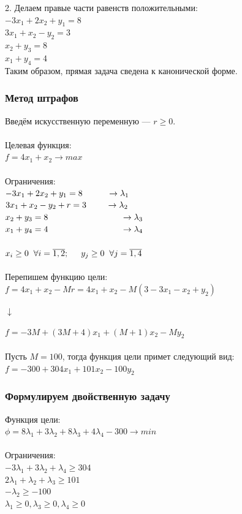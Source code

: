 \documentclass[14pt,a4paper,fleqn]{extarticle}
\begin{document}
2. Делаем правые части равенств положительными:\\
$-3x_1 + 2x_2 + y_1 = 8$\\
$3x_1 + x_2 - y_2 = 3$\\
$x_2 + y_3 = 8$\\
$x_1 + y_4 = 4$\\

Таким образом, прямая задача сведена к канонической форме.
\newpage
\subsubsection*{Метод штрафов}
Введём искусственную переменную --- $r \geq 0$.\\\\
Целевая функция:\\
$f = 4x_1+x_2 \longrightarrow max$\\\\
Ограничения:\\
$-3x_1 + 2x_2 + y_1 = 8 \hspace*{1cm} \rightarrow \lambda_1$\\
$3x_1 + x_2 - y_2 + r = 3 \hspace*{0.8cm} \rightarrow \lambda_2$\\
$x_2 + y_3 = 8 \hspace*{3cm} \rightarrow \lambda_3$\\
$x_1 + y_4 = 4 \hspace*{3cm} \rightarrow \lambda_4$\\\\
$x_i \geq 0 \hspace{0.2cm} \forall i = \overline{1,2}; \hspace{0.5cm} y_j \geq 0 \hspace{0.2cm} \forall j =  \overline{1,4}$\\\\
Перепишем функцию цели:\\
$f = 4x_1 + x_2 - Mr = 4x_1 + x_2 - M(3 - 3x_1 - x_2 + y_2)$
\begin{center}$\downarrow$\end{center}
$f = -3M + (3M + 4)x_1 + (M + 1)x_2 - My_2$\\\\
Пусть $M = 100$, тогда функция цели примет следующий вид:\\
$f = -300 + 304x_1 + 101x_2 - 100y_2$
\subsubsection*{Формулируем двойственную задачу}
Функция цели:\\
$\phi = 8\lambda_1 + 3\lambda_2 + 8\lambda_3 + 4\lambda_4 - 300 \longrightarrow min$\\\\
Ограничения:\\
$-3\lambda_1 + 3\lambda_2 + \lambda_4 \geq 304$\\
$2\lambda_1 + \lambda_2 + \lambda_3 \geq 101$\\
$-\lambda_2 \geq -100$\\
$\lambda_1 \geq 0, \lambda_3 \geq 0, \lambda_4 \geq 0$
\newpage
\end{document}
